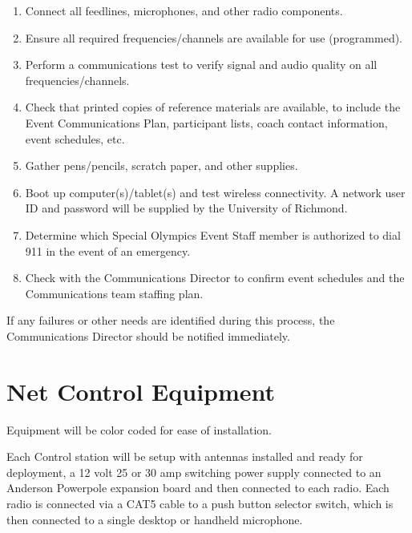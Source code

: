 \documentclass[pdflatex,letterpaper,twoside,12pt]{book}
\begin{document}
\begin{enumerate}
	\item Connect all feedlines, microphones, and other radio components.
	\item Ensure all required frequencies/channels are available for use (programmed).
	\item Perform a communications test to verify signal and audio quality on all frequencies/channels.
	\item Check that printed copies of reference materials are available, to include the Event Communications Plan, participant lists, coach contact information, event schedules, etc. %
	\item Gather pens/pencils, scratch paper, and other supplies.
	\item Boot up computer(s)/tablet(s) and test wireless connectivity.  A network user ID and password will be supplied by the University of Richmond.
	\item Determine which Special Olympics Event Staff member is authorized to dial 911 in the event of an emergency.
	\item Check with the Communications Director to confirm event schedules and the Communications team staffing plan.
\end{enumerate}

If any failures or other needs are identified during this process, the Communications Director should be notified immediately.

\iffalse %
Equipment checks, opening script, etc
...and is this the best placement for this section?
\fi


\section{Net Control Equipment}

Equipment will be color coded for ease of installation.

Each Control station will be setup with antennas installed and ready for deployment, a 12 volt 25 or 30 amp switching power supply connected to an Anderson Powerpole expansion board and then connected to each radio. Each radio is connected via a CAT5 cable to a push button selector switch, which is then connected to a single desktop or handheld microphone.
\end{document}
